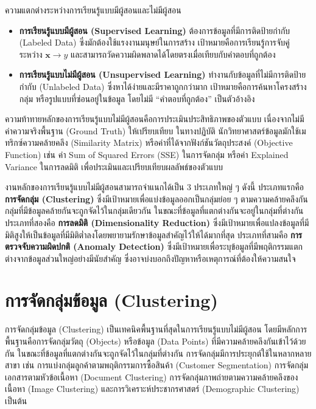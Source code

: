 \begin{myLimit}[]{ความแตกต่างระหว่างการเรียนรู้แบบมีผู้สอนและไม่มีผู้สอน}{}
\begin{itemize}
    \item \textbf{การเรียนรู้แบบมีผู้สอน (Supervised Learning)} ต้องการข้อมูลที่มีการติดป้ายกำกับ (Labeled Data) ซึ่งมักต้องใช้แรงงานมนุษย์ในการสร้าง เป้าหมายคือการเรียนรู้การจับคู่ระหว่าง $\mathbf{x} \to y$ และสามารถวัดความผิดพลาดได้โดยตรงเมื่อเทียบกับคำตอบที่ถูกต้อง

    \item \textbf{การเรียนรู้แบบไม่มีผู้สอน (Unsupervised Learning)} ทำงานกับข้อมูลที่ไม่มีการติดป้ายกำกับ (Unlabeled Data) ซึ่งหาได้ง่ายและมีราคาถูกกว่ามาก เป้าหมายคือการค้นหาโครงสร้าง กลุ่ม หรือรูปแบบที่ซ่อนอยู่ในข้อมูล โดยไม่มี ``คำตอบที่ถูกต้อง'' เป็นตัวอ้างอิง
\end{itemize}
\end{myLimit}

ความท้าทายหลักของการเรียนรู้แบบไม่มีผู้สอนคือการประเมินประสิทธิภาพของตัวแบบ เนื่องจากไม่มีค่าความจริงพื้นฐาน (Ground Truth) ให้เปรียบเทียบ ในทางปฏิบัติ นักวิทยาศาสตร์ข้อมูลมักใช้เมทริกซ์ความคล้ายคลึง (Similarity Matrix) หรือค่าที่ได้จากฟังก์ชันวัตถุประสงค์ (Objective Function) เช่น ค่า Sum of Squared Errors (SSE) ในการจัดกลุ่ม หรือค่า Explained Variance ในการลดมิติ เพื่อประเมินและเปรียบเทียบผลลัพธ์ของตัวแบบ

งานหลักของการเรียนรู้แบบไม่มีผู้สอนสามารถจำแนกได้เป็น 3 ประเภทใหญ่ ๆ ดังนี้ ประเภทแรกคือ \textbf{การจัดกลุ่ม (Clustering)} ซึ่งมีเป้าหมายเพื่อแบ่งข้อมูลออกเป็นกลุ่มย่อย ๆ ตามความคล้ายคลึงกัน กลุ่มที่มีข้อมูลคล้ายกันจะถูกจัดไว้ในกลุ่มเดียวกัน ในขณะที่ข้อมูลที่แตกต่างกันจะอยู่ในกลุ่มที่ต่างกัน ประเภทที่สองคือ \textbf{การลดมิติ (Dimensionality Reduction)} ซึ่งมีเป้าหมายเพื่อแปลงข้อมูลที่มีมิติสูงให้เป็นข้อมูลที่มีมิติต่ำลงโดยพยายามรักษาข้อมูลสำคัญไว้ให้ได้มากที่สุด ประเภทที่สามคือ \textbf{การตรวจจับความผิดปกติ (Anomaly Detection)} ซึ่งมีเป้าหมายเพื่อระบุข้อมูลที่มีพฤติกรรมแตกต่างจากข้อมูลส่วนใหญ่อย่างมีนัยสำคัญ ซึ่งอาจบ่งบอกถึงปัญหาหรือเหตุการณ์ที่ต้องให้ความสนใจ

\section{การจัดกลุ่มข้อมูล (Clustering)}

การจัดกลุ่มข้อมูล (Clustering) เป็นเทคนิคพื้นฐานที่สุดในการเรียนรู้แบบไม่มีผู้สอน โดยมีหลักการพื้นฐานคือการจัดกลุ่มวัตถุ (Objects) หรือข้อมูล (Data Points) ที่มีความคล้ายคลึงกันเข้าไว้ด้วยกัน ในขณะที่ข้อมูลที่แตกต่างกันจะถูกจัดไว้ในกลุ่มที่ต่างกัน การจัดกลุ่มมีการประยุกต์ใช้ในหลากหลายสาขา เช่น การแบ่งกลุ่มลูกค้าตามพฤติกรรมการซื้อสินค้า (Customer Segmentation) การจัดกลุ่มเอกสารตามหัวข้อเนื้อหา (Document Clustering) การจัดกลุ่มภาพถ่ายตามความคล้ายคลึงของเนื้อหา (Image Clustering) และการวิเคราะห์ประชากรศาสตร์ (Demographic Clustering) เป็นต้น

